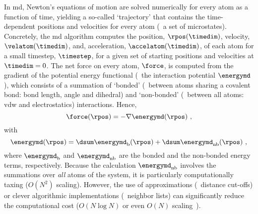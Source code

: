 In \gls{md}, Newton's equations of motion are solved numerically for every atom as a function of time,
yielding a so-called `trajectory' that contains the time-dependent positions and velocities for every atom
(\ie~a set of microstates). Concretely, the \gls{md} algorithm computes the position, $\rpos(\timedim)$,
velocity, $\velatom(\timedim)$, and, acceleration, $\accelatom(\timedim)$, of each atom for a small
timestep\footnotemark, $\timestep$, for a given set of starting positions and velocities at $\timedim = 0$.%
%
%
The net force on every atom, $\force$, is computed from the gradient of the potential energy functional
(\ie~the interaction potential $\energymd$), which consists of a summation of `bonded' (\ie~between atoms
sharing a covalent bond: bond length, angle and dihedral) and `non-bonded' (\ie~between all atoms: \gls{vdw}
and electrostatics) interactions. Hence,
%
\begin{equation}\label{eq:nanopores_md_force}
  \force (\rpos) = - \nabla \energymd (\rpos)
  \text{ ,}
\end{equation}
%
with
%
\begin{equation}\label{eq:nanopores_md_energy}
  \energymd (\rpos) = \dsum \energymd_{\text{b}} (\rpos) + \dsum \energymd_{\text{nb}} (\rpos)
  \text{ ,}
\end{equation}
%
where $\energymd_{\text{b}}$ and $\energymd_{\text{nb}}$ are the bonded and the non-bonded energy terms,
respectively. Because the calculation $\energymd_{\text{nb}}$ involves the summations over \emph{all} atoms of
the system, it is particularly computationally taxing ($O(N^2)$ scaling). However, the use of approximations
(\eg~distance cut-offs) or clever algorithmic implementations (\eg~neighbor lists) can significantly reduce
the computational cost ($O(N\log N)$ or even $O(N)$ scaling~\cite{Eastman-2010}).

